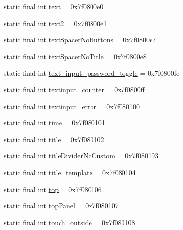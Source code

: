 \begin{DoxyCompactItemize}
\item 
static final int \mbox{\hyperlink{classandroid_1_1support_1_1design_1_1R_1_1id_a42faaf7f13a49213f874ef8cb4e68ee1}{text}} = 0x7f0800e0
\item 
static final int \mbox{\hyperlink{classandroid_1_1support_1_1design_1_1R_1_1id_a65e945658c4131f7246b3447a632bccf}{text2}} = 0x7f0800e1
\item 
static final int \mbox{\hyperlink{classandroid_1_1support_1_1design_1_1R_1_1id_a56c833c59cf9349be24f83f9e9dea560}{text\+Spacer\+No\+Buttons}} = 0x7f0800e7
\item 
static final int \mbox{\hyperlink{classandroid_1_1support_1_1design_1_1R_1_1id_ac4df85eb99a5c88371d15995269b0cd6}{text\+Spacer\+No\+Title}} = 0x7f0800e8
\item 
static final int \mbox{\hyperlink{classandroid_1_1support_1_1design_1_1R_1_1id_a77c3ac2414c276faa7936afbef217ab0}{text\+\_\+input\+\_\+password\+\_\+toggle}} = 0x7f0800fe
\item 
static final int \mbox{\hyperlink{classandroid_1_1support_1_1design_1_1R_1_1id_a3e209a8a91205164870a6a2004def118}{textinput\+\_\+counter}} = 0x7f0800ff
\item 
static final int \mbox{\hyperlink{classandroid_1_1support_1_1design_1_1R_1_1id_a2f78eeb6c053613a83de5e30874f4842}{textinput\+\_\+error}} = 0x7f080100
\item 
static final int \mbox{\hyperlink{classandroid_1_1support_1_1design_1_1R_1_1id_ab05973571013eeb8a42479f708d42317}{time}} = 0x7f080101
\item 
static final int \mbox{\hyperlink{classandroid_1_1support_1_1design_1_1R_1_1id_a15e74af9346f557351ae9e43a3ab4da1}{title}} = 0x7f080102
\item 
static final int \mbox{\hyperlink{classandroid_1_1support_1_1design_1_1R_1_1id_a3685419c81ad5d66fb1cef37917b8008}{title\+Divider\+No\+Custom}} = 0x7f080103
\item 
static final int \mbox{\hyperlink{classandroid_1_1support_1_1design_1_1R_1_1id_a9a4ba99ff46ad16c6c732490f0740ffd}{title\+\_\+template}} = 0x7f080104
\item 
static final int \mbox{\hyperlink{classandroid_1_1support_1_1design_1_1R_1_1id_aa710ae6c7f9597ec94d2008d8a70b056}{top}} = 0x7f080106
\item 
static final int \mbox{\hyperlink{classandroid_1_1support_1_1design_1_1R_1_1id_a7eef3c87506e53208c3243360b38242c}{top\+Panel}} = 0x7f080107
\item 
static final int \mbox{\hyperlink{classandroid_1_1support_1_1design_1_1R_1_1id_ab8211b0d7277775cf8c214969d03915e}{touch\+\_\+outside}} = 0x7f080108

\end{DoxyCompactItemize}
